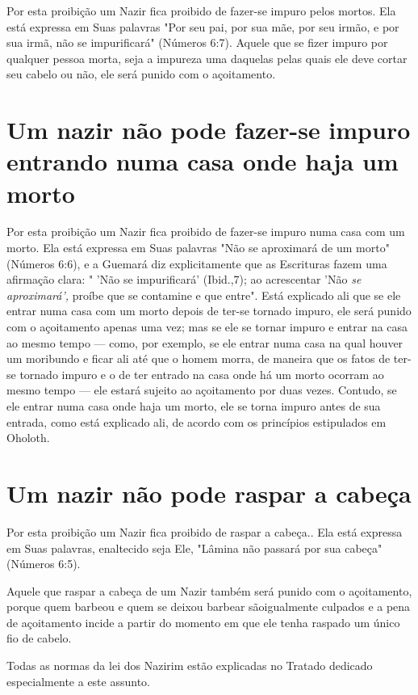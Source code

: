 Por esta proibição um Nazir fica proibido de fazer-se impuro pelos
mortos. Ela está expressa em Suas palavras "Por seu pai, por sua mãe,
por seu irmão, e por sua irmã, não se impurificará" (Números 6:7).
Aquele que se fizer impuro por qualquer pessoa morta, seja a impureza
uma daquelas pelas quais ele deve cortar seu cabelo ou não, ele será
punido com o açoitamento.

\section{Um nazir não pode fazer-se impuro entrando numa casa onde haja um
morto}

Por esta proibição um Nazir fica proibido de fazer-se impuro numa casa
com um morto. Ela está expressa em Suas palavras "Não se aproximará de
um morto" (Números 6:6), e a Guemará diz explicitamente que as
Escrituras fazem uma afirmação clara: " 'Não se impurificará' (Ibid.,7);
ao acrescentar 'Não \emph{se aproximará',} proíbe que se contamine e que
entre". Está explicado ali que se ele entrar numa casa com um morto
depois de ter-se tornado impuro, ele será punido com o açoitamento
apenas uma vez; mas se ele se tornar impuro e entrar na casa ao mesmo
tempo --- como, por exemplo, se ele entrar numa casa na qual houver um
moribundo e ficar ali até que o homem morra, de ma­neira que os fatos de
ter-se tornado impuro e o de ter entrado na casa onde há um morto
ocorram ao mesmo tempo --- ele estará sujeito ao açoitamento por duas
vezes. Contudo, se ele entrar numa casa onde haja um morto, ele se torna
impuro antes de sua entrada, como está explicado ali, de acordo com os
princípios estipulados em Oholoth.

\section{Um nazir não pode raspar a cabeça}

Por esta proibição um Nazir fica proibido de raspar a cabeça.. Ela es­tá
expressa em Suas palavras, enaltecido seja Ele, "Lâmina não passará por
sua cabeça" (Números 6:5).

Aquele que raspar a cabeça de um Nazir também será punido com o
açoitamento, porque quem barbeou e quem se deixou barbear sãoigualmen­te
culpados e a pena de açoitamento incide a partir do momento em que ele
tenha raspado um único fio de cabelo.

Todas as normas da lei dos Nazirim estão explicadas no Tratado de­dicado
especialmente a este assunto.

